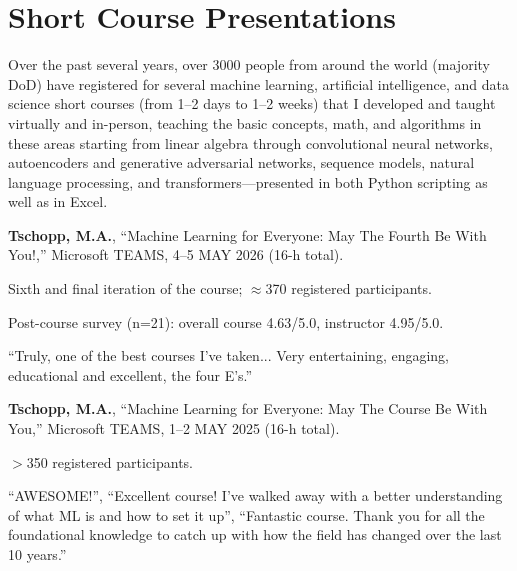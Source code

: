 \section{\sc Short Course Presentations}

Over the past several years, over 3000 people from around the world (majority DoD) have registered for several machine learning, artificial intelligence, and data science short courses (from 1--2 days to 1--2 weeks) that I developed and taught virtually and in-person, teaching the basic concepts, math, and algorithms in these areas starting from linear algebra through convolutional neural networks, autoencoders and generative adversarial networks, sequence models, natural language processing, and transformers---presented in both Python scripting as well as in Excel. 

\begin{cvlist}
\setlength{\itemsep}{0in}
\setlength{\parsep}{0in} 
\setlength{\parskip}{0in}
\setlength{\topsep}{0in} 
\setlength{\partopsep}{0in} 
\setlength{\leftmargin}{0.2in}

\item
\textbf{Tschopp, M.A.}, ``Machine Learning for Everyone: May The Fourth Be With You!,'' Microsoft TEAMS, 4--5 MAY 2026 (16-h total).
\begin{list2}
\item[$\star$] Sixth and final iteration of the course; $\approx$370 registered participants.
\item[$\star$] Post-course survey (n=21): overall course 4.63/5.0, instructor 4.95/5.0.
\item[$\star$] ``Truly, one of the best courses I've taken... Very entertaining, engaging, educational and excellent, the four E's.''
\end{list2}

\item
\textbf{Tschopp, M.A.}, ``Machine Learning for Everyone: May The Course Be With You,'' Microsoft TEAMS, 1--2 MAY 2025 (16-h total).
\begin{list2}
\item[$\star$] $>$350 registered participants.
\item[$\star$] ``AWESOME!'', ``Excellent course! I've walked away with a better understanding of what ML is and how to set it up'', ``Fantastic course. Thank you for all the foundational knowledge to catch up with how the field has changed over the last 10 years.''
\end{list2}


\end{cvlist}
